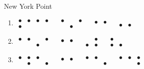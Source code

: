 \begin{refsection}
\begin{problem}{New York Point}{\namePLittell}{}
\begin{multicols}{2}
\begin{enumerate}
\item {\Large \boldmath$\begin{smallmatrix} 
    \bullet & \bullet & \bullet & \bullet \\ \bullet & &  &
\end{smallmatrix}$\ \ $\begin{smallmatrix}
  \bullet & & \bullet \\  & \bullet &
\end{smallmatrix}$\ \ $\begin{smallmatrix}
  \bullet & \bullet \\  & 
\end{smallmatrix}$\ \ $\begin{smallmatrix}
  &  \\ \bullet& \bullet
\end{smallmatrix}$}
    
\item {\Large \boldmath$\begin{smallmatrix} 
    \bullet & \bullet &  & \bullet \\  & & \bullet &
\end{smallmatrix}$\ \ $\begin{smallmatrix}
  \bullet & \bullet \\  & 
\end{smallmatrix}$\ \ $\begin{smallmatrix}
  & \bullet \\ \bullet & \bullet
\end{smallmatrix}$\ \ $\begin{smallmatrix}
  \bullet &  \\ \bullet& \bullet
\end{smallmatrix}$}

\item {\Large \boldmath$\begin{smallmatrix} 
    \bullet & \bullet & \bullet &  \\  &\bullet &  &\bullet
\end{smallmatrix}$\ \ $\begin{smallmatrix}
  \bullet & \bullet \\  & 
\end{smallmatrix}$\ \ $\begin{smallmatrix}
  \bullet & \bullet & \\  & & \bullet
\end{smallmatrix}$\ \ $\begin{smallmatrix}
  \bullet & \bullet & \bullet \\ & & \bullet
\end{smallmatrix}$}


\end{enumerate}
\end{multicols}
\end{problem}
\end{refsection}
